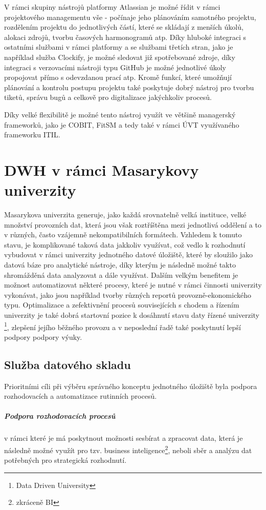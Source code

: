 \documentclass[
  digital,     %
  twoside,     %
  lof,         %
  lot,         %
]{fithesis4}
\begin{document}
V rámci skupiny nástrojů platformy Atlassian je možné řídit v rámci projektového managementu vše - počínaje jeho plánováním samotného projektu,  rozdělením projektu do jednotlivých částí, které se skládají z menších úkolů, alokaci zdrojů, tvorbu časových harmonogramů atp. Díky hluboké integraci s ostatními službami v rámci platformy a se službami třetích stran, jako je například služba Clockify, je možné sledovat již spotřebované zdroje, díky integraci s verzovacími nástroji typu GitHub je možné jednotlivé úkoly propojovat přímo s odevzdanou prací atp. Kromě funkcí, které umožňují plánování a kontrolu postupu projektu také poskytuje dobrý nástroj pro tvorbu tiketů, správu bugů a celkově pro digitalizace jakýchkoliv procesů.  

Díky velké flexibilitě je možné tento nástroj využít ve většině managerský frameworků, jako je COBIT, FitSM a tedy také v rámci ÚVT využívaného frameworku ITIL.

\chapter{DWH v rámci Masarykovy univerzity}
Masarykova univerzita generuje, jako každá srovnatelně velká instituce, velké množství provozních dat, která jsou však roztříštěna mezi jednotlivá oddělení a to v různých, často vzájemně nekompatibilních formátech. Vzhledem k tomuto stavu, je  komplikované taková data jakkoliv využívat, což vedlo k rozhodnutí  vybudovat v rámci univerzity jednotného datové úložiště, které by sloužilo jako datová báze pro analytické nástroje, díky kterým je následně možné takto shromážděná data analyzovat a dále využívat. Dalším velkým benefitem je možnost automatizovat některé procesy, které je nutné v rámci činnosti univerzity vykonávat, jako jsou například tvorby různých reportů provozně-ekonomického typu. Optimalizace a zefektivnění procesů souvisejících s chodem a řízením univerzity je také dobrá startovní pozice k dosáhnutí stavu daty řízené univerzity \footnote{Data Driven University}, zlepšení jejího běžného provozu a v neposlední řadě také poskytnutí lepší podpory podpory výuky.

\section{Služba datového skladu}
Prioritními cíli při výběru správného konceptu jednotného úložiště byla podpora rozhodovacích a automatizace rutinních procesů. 
\paragraph{Podpora rozhodovacích procesů} v rámci které je má poskytnout možnosti sesbírat a zpracovat data, která je následně možné využít pro tzv. business inteligence\footnote{zkráceně BI}, neboli sběr a analýzu dat potřebných pro strategická rozhodnutí.
\end{document}
